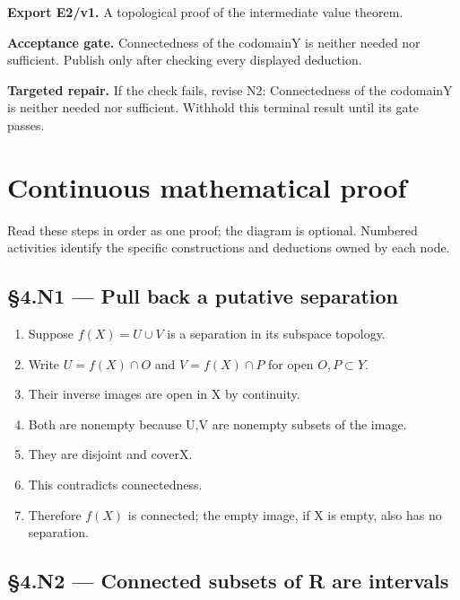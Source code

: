\documentclass[preprint,12pt,aps,pra,showkeys,amsmath,amssymb,superscriptaddress,floatfix]{revtex4-2}
\theoremstyle{definition}
\theoremstyle{remark}
\newcommand{\field}[2]{\par\smallskip\noindent\textbf{#1.} #2\par}
\begin{document}
\field{Export E2/v1}{A topological proof of the intermediate value theorem.}

\field{Acceptance gate}{Connectedness of the codomainY is neither needed nor sufficient. Publish
only after checking every displayed deduction.}

\field{Targeted repair}{If the check fails, revise N2: Connectedness of the codomainY is neither
needed nor sufficient. Withhold this terminal result until its gate
passes.}

\endgroup\clearpage\section{Continuous mathematical proof}\label{sec:proof}

Read these steps in order as one proof; the diagram is optional.
Numbered activities identify the specific constructions and deductions
owned by each node.

\subsection{§4.N1 --- Pull back a putative
separation}\label{n1-pull-back-a-putative-separation}

\begin{enumerate}
\def\labelenumi{\arabic{enumi}.}
\item
  Suppose \(f(X)=U\cup V\) is a separation in its subspace topology.
\item
  Write \(U=f(X)\cap O\) and \(V=f(X)\cap P\) for open \(O,P\subset Y\).
\item
  Their inverse images are open in X by continuity.
\item
  Both are nonempty because U,V are nonempty subsets of the image.
\item
  They are disjoint and coverX.
\item
  This contradicts connectedness.
\item
  Therefore \(f(X)\) is connected; the empty image, if X is empty, also
  has no separation.
\end{enumerate}

\subsection{§4.N2 --- Connected subsets of R are
intervals}\label{n2-connected-subsets-of-r-are-intervals}
\end{document}
